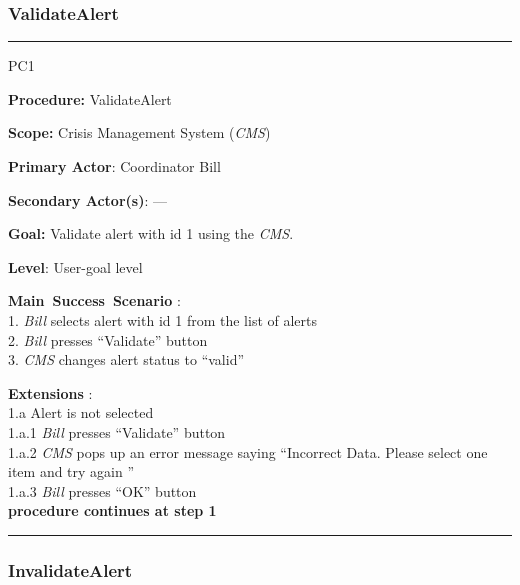 \subsubsection{ValidateAlert}

\vspace{0.5cm}
\hrule
\begin{lyxlist}{PC1}
\small{
\item [\textbf{Procedure:}] ValidateAlert
\item [\textbf{Scope:}] Crisis Management System (\emph{CMS})
\item [\textbf{Primary Actor}:] Coordinator Bill
\item [\textbf{Secondary Actor(s)}:] ---
\item [\textbf{Goal:}] Validate alert with id 1 using the \emph{CMS}.
\item [\textbf{Level}:] User-goal level
\item [\textbf{Main~Success~Scenario}]:\\
1. \emph{Bill} selects alert with id 1 from the list of alerts\\
2. \emph{Bill} presses ``Validate'' button\\
3. \emph{CMS} changes alert status to ``valid''\\

\item [\textbf{Extensions}]:\\
1.a Alert is not selected\\
\hspace*{0.5cm} 1.a.1 \emph{Bill} presses ``Validate'' button\\
\hspace*{0.5cm} 1.a.2 \emph{CMS} pops up an error message saying ``Incorrect
Data. Please select one item and try again ''\\
\hspace*{0.5cm} 1.a.3 \emph{Bill} presses ``OK'' button\\
\hspace*{0.5cm} \textbf{procedure continues at step 1}
}
\end{lyxlist}
\hrule
\vspace{0.5cm}

\subsubsection{InvalidateAlert}

